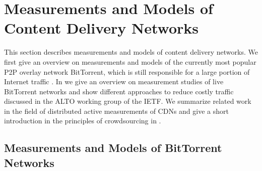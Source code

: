 \section{Measurements and Models of Content Delivery Networks}\label{sec:aslevel:measurements}

This section describes measurements and models of content delivery networks.
We first give an overview on measurements and models of the currently most popular P2P overlay network BitTorrent, which is still responsible for a large portion of Internet traffic \cite{cisco2016,wamser2010}.
In  we give an overview on measurement studies of live BitTorrent networks and show different approaches to reduce costly traffic discussed in the ALTO working group of the IETF.
We summarize related work in the field of distributed active measurements of CDNs and give a short introduction in the principles of crowdsourcing in .

\subsection{Measurements and Models of BitTorrent Networks}\label{aslevel:measurements:bittorrent}

